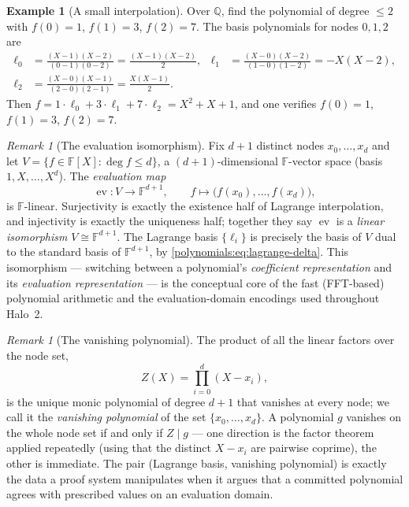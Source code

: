 \documentclass[11pt,a4paper]{article}
\theoremstyle{definition}
\newtheorem{example}[theorem]{Example}
\theoremstyle{remark}
\newtheorem{remark}[theorem]{Remark}
\newcommand{\Q}{\ensuremath{\mathbb{Q}}}
\newcommand{\F}{\ensuremath{\mathbb{F}}}
\begin{document}
\begin{example}[A small interpolation]\label{polynomials:exa:lagrange}
Over \(\Q\), find the polynomial of degree \(\le 2\) with \(f(0) = 1\),
\(f(1) = 3\), \(f(2) = 7\). The basis polynomials for nodes \(0, 1, 2\) are
\begin{align*}
  \ell_0 &= \frac{(X-1)(X-2)}{(0-1)(0-2)} = \frac{(X-1)(X-2)}{2}, &
  \ell_1 &= \frac{(X-0)(X-2)}{(1-0)(1-2)} = -X(X-2), \\
  \ell_2 &= \frac{(X-0)(X-1)}{(2-0)(2-1)} = \frac{X(X-1)}{2}.
\end{align*}
Then
\(f = 1 \cdot \ell_0 + 3 \cdot \ell_1 + 7 \cdot \ell_2 = X^2 + X + 1\), and one
verifies \(f(0) = 1\), \(f(1) = 3\), \(f(2) = 7\).
\end{example}

\begin{remark}[The evaluation isomorphism]\label{polynomials:rem:eval-iso}
Fix \(d + 1\) distinct nodes \(x_0, \dots, x_d\) and let \(V = \{f \in \F[X] :
\deg f \le d\}\), a \((d{+}1)\)-dimensional \(\F\)-vector space (basis
\(1, X, \dots, X^d\)). The \emph{evaluation map}
\[
  \operatorname{ev} \colon V \to \F^{d+1},
  \qquad f \mapsto \bigl(f(x_0), \dots, f(x_d)\bigr),
\]
is \(\F\)-linear. Surjectivity is exactly the existence half of Lagrange
interpolation, and injectivity is exactly the uniqueness half; together they say
\(\operatorname{ev}\) is a \emph{linear isomorphism}
\(V \cong \F^{d+1}\). The Lagrange basis \(\{\ell_i\}\) is precisely the basis of
\(V\) dual to the standard basis of \(\F^{d+1}\), by
\eqref{polynomials:eq:lagrange-delta}. This isomorphism — switching between a
polynomial's \emph{coefficient representation} and its \emph{evaluation
representation} — is the conceptual core of the fast (FFT-based) polynomial
arithmetic and the evaluation-domain encodings used throughout Halo~2.
\end{remark}

\begin{remark}[The vanishing polynomial]\label{polynomials:rem:vanishing}
The product of all the linear factors over the node set,
\[
  Z(X) = \prod_{i=0}^{d} (X - x_i),
\]
is the unique monic polynomial of degree \(d + 1\) that vanishes at every node;
we call it the \emph{vanishing polynomial} of the set
\(\{x_0, \dots, x_d\}\). A polynomial \(g\) vanishes on the whole node set if and
only if \(Z \mid g\) — one direction is the factor theorem applied repeatedly
(using that the distinct \(X - x_i\) are pairwise coprime), the other is
immediate. The pair (Lagrange basis, vanishing polynomial) is exactly the data a
proof system manipulates when it argues that a committed polynomial agrees with
prescribed values on an evaluation domain.
\end{remark}
\end{document}
